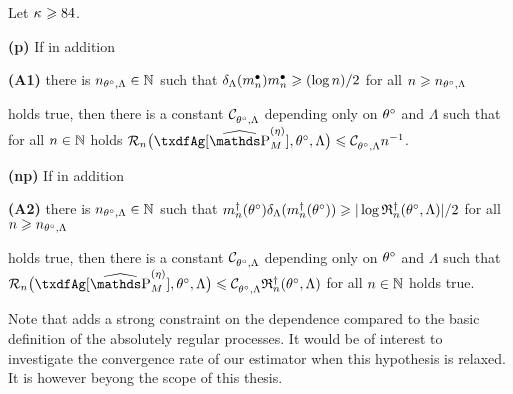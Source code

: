 \begin{cor}
  Let $\cpen \geq 84$.
  \begin{Liste}[]
  \item[{\dgrau\bfseries{(p)}}]
    If in addition
    \begin{inparaenum}\item[{{\dgrau\bfseries(A1)}}]
      there is $\ssY_{\xdf,\Lambda}\in\Nz$ such that
      $\cmiSv[\sDi{\ssY}]\sDi{\ssY}\geq (\log\ssY)/2$ for all
      $\ssY\geq \ssY_{\xdf,\Lambda}$
    \end{inparaenum}
    holds true, then there is a constant $\cst{\xdf,\Lambda}$ depending
    only on $\xdf$ and $\Lambda$ such that for all $n\in\Nz$ holds
    $\nRi{\txdfAg[{\erWe[]}]}{\xdf,\Lambda} \leq
    \cst{\xdf,\Lambda}\ssY^{-1}$.
  \item[{\dgrau\bfseries{(np)}}]
    If in addition
    \begin{inparaenum}\item[{{\dgrau\bfseries(A2)}}]
      there is  $\ssY_{\xdf,\Lambda}\in\Nz$ such that
      $\aDi{\ssY}(\xdf)\cmSv[\aDi{\ssY}(\xdf)]\geq \vert \log\naRa{(\xdf,\Lambda)} \vert/2 $
      for all $\ssY\geq \ssY_{\xdf,\Lambda}$
    \end{inparaenum}
    holds true, then there is a constant $\cst{\xdf,\Lambda}$ depending
    only on $\xdf$ and $\Lambda$ such that $\nRi{\txdfAg[{\erWe[]}]}{\xdf,\Lambda}
    \leq \cst{\xdf,\Lambda}\naRa{(\xdf,\Lambda)}$ for all $n\in\Nz$ holds true.
  \end{Liste} 
    \reEnd 
\end{cor}

Note that  adds a strong constraint on the dependence compared to the basic definition of the absolutely regular processes.
It would be of interest to investigate the convergence rate of our estimator when this hypothesis is relaxed.
It is however beyong the scope of this thesis.

